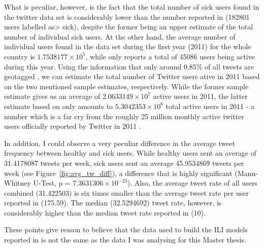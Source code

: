 \documentclass[11pt, a4paper]{report}\usepackage[]{graphicx}\usepackage[]{color}
\begin{document}
What is peculiar, however, is the fact that the total number of sick users found in the twitter data set is considerably lower than the number reported in \citep{bodnar_data_2015} (182801 users labelled as> sick), despite the former being an upper estimate of the total number of individual sick users. At the other hand, the average number of individual users found in the data set during the first year (2011) for the whole country is \ensuremath{1.7538177\times 10^{5}}, while \citep{bodnar_data_2015} only reports a total of 45086 users being active during this year. Using the information that only around 0.85\% of all tweets are geotagged \citep{sloan_who_2015}, we can estimate the total number of Twitter users ative in 2011 based on the two mentioned sample estimates, respectively. While the former sample estimate gives us an average of \ensuremath{2.0633149\times 10^{7}} active users in 2011, the latter estimate based on \cite{bodnar_data_2015} only amounts to \ensuremath{5.3042353\times 10^{6}} total active users in 2011 - a number which is a far cry from the roughly 25 million monthly active twitter users officially reported by Twitter in 2011 \citep{twitter_twitter_2013_annual_report_2013}. \newline

In addition, I could observe a very peculiar difference in the average tweet frequency between healthy and sick users. While healthy users sent an average of 31.4178087 tweets per week, sick users sent an average 45.9534869 tweets per week (see Figure~\ref{fig:avg_tw_diff}), a difference that is highly significant (Mann-Whitney U-Test, p = \ensuremath{7.3631306\times 10^{-23}}). Also, the average tweet rate of all users combined (31.422503) is six times smaller than the average tweet rate per user reported in \citep{bodnar_data_2015} (175.59). The median (32.5294692) tweet rate, however, is considerably higher than the median tweet rate reported in \citep{bodnar_data_2015} (10).\newline

These points give reason to believe that the data used to build the ILI models reported in \citep{bodnar_data_2015} is not the same as the data I was analysing for this Master thesis.\newline
\end{document}

